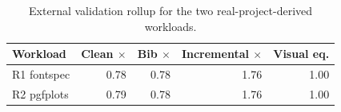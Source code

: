 \begin{table}[t]
\centering
\caption{External validation rollup for the two real-project-derived workloads.}
\label{tab:external-validation}
\begin{tabular}{lrrrr}
\toprule
Workload & Clean $\times$ & Bib $\times$ & Incremental $\times$ & Visual eq. \\
\midrule
R1 fontspec & 0.78 & 0.78 & 1.76 & 1.00 \\
R2 pgfplots & 0.79 & 0.78 & 1.76 & 1.00 \\
\bottomrule
\end{tabular}
\end{table}
